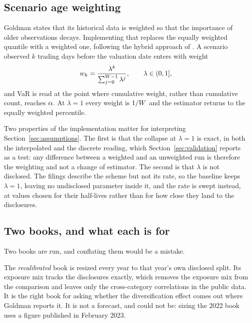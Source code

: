 \subsection{Scenario age weighting}

Goldman states that its historical data is weighted so that the importance of
older observations decays. Implementing that replaces the equally weighted
quantile with a weighted one, following the hybrid approach of
\citet{boudoukh1998hybrid}. A scenario observed $k$ trading days before the
valuation date enters with weight
\begin{equation}
w_{k} = \frac{\lambda^{k}}{\sum_{j=0}^{W-1} \lambda^{j}} ,
\qquad \lambda \in (0, 1] ,
\label{eq:ageweights}
\end{equation}
and VaR is read at the point where cumulative weight, rather than cumulative
count, reaches $\alpha$. At $\lambda = 1$ every weight is $1/W$ and the
estimator returns to the equally weighted percentile.

Two properties of the implementation matter for interpreting
Section~\ref{sec:assumptions}. The first is that the collapse at $\lambda = 1$
is exact, in both the interpolated and the discrete reading, which
Section~\ref{sec:validation} reports as a test: any difference between a
weighted and an unweighted run is therefore the weighting and not a change of
estimator. The second is that $\lambda$ is not disclosed. The filings describe
the scheme but not its rate, so the baseline keeps $\lambda = 1$, leaving no
undisclosed parameter inside it, and the rate is swept instead, at values
chosen for their half-lives rather than for how close they land to the
disclosures.

\subsection{Two books, and what each is for}

Two books are run, and conflating them would be a mistake.

The \emph{recalibrated} book is resized every year to that year's own disclosed
split. Its exposure mix tracks the disclosures exactly, which removes the
exposure mix from the comparison and leaves only the cross-category
correlations in the public data. It is the right book for asking whether the
diversification effect comes out where Goldman reports it. It is not a
forecast, and could not be: sizing the 2022 book uses a figure published in
February 2023.

